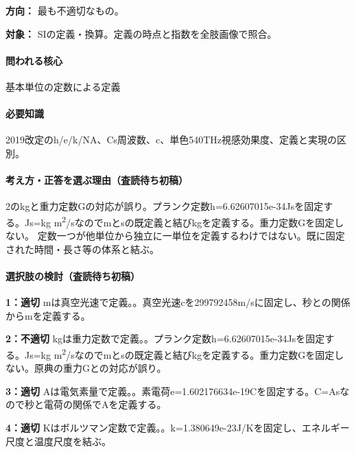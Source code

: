 \noindent\textbf{方向：} 最も不適切なもの。\par

\noindent\textbf{対象：} SIの定義・換算。定義の時点と指数を全肢画像で照合。\par

\paragraph{問われる核心} 基本単位の定数による定義

\paragraph{必要知識} 2019改定のh/e/k/NA、Cs周波数、c、単色540THz視感効果度、定義と実現の区別。

\paragraph{考え方・正答を選ぶ理由（査読待ち初稿）} 2のkgと重力定数Gの対応が誤り。プランク定数h=\allowbreak{}6.62607015e-34Jsを固定する。Js=\allowbreak{}kg m\textsuperscript{2}/sなのでmとsの既定義と結びkgを定義する。重力定数Gを固定しない。 定数一つが他単位から独立に一単位を定義するわけではない。既に固定された時間・長さ等の体系と結ぶ。

\paragraph{選択肢の検討（査読待ち初稿）}\mbox{}\par

\noindent\textbf{1：適切} mは真空光速で定義。。真空光速cを299792458m/sに固定し、秒との関係からmを定義する。\par

\noindent\textbf{2：不適切} kgは重力定数で定義。。プランク定数h=\allowbreak{}6.62607015e-34Jsを固定する。Js=\allowbreak{}kg m\textsuperscript{2}/sなのでmとsの既定義と結びkgを定義する。重力定数Gを固定しない。原典の重力Gとの対応が誤り。\par

\noindent\textbf{3：適切} Aは電気素量で定義。。素電荷e=\allowbreak{}1.602176634e-19Cを固定する。C=\allowbreak{}Asなので秒と電荷の関係でAを定義する。\par

\noindent\textbf{4：適切} Kはボルツマン定数で定義。。k=\allowbreak{}1.380649e-23J/Kを固定し、エネルギー尺度と温度尺度を結ぶ。\par

